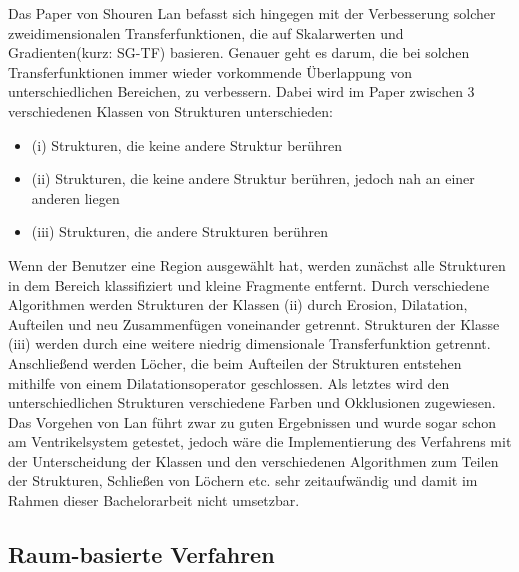 Das Paper von Shouren Lan \cite{lan2017improving} befasst sich hingegen mit der Verbesserung solcher zweidimensionalen Transferfunktionen, die auf Skalarwerten und Gradienten(kurz: SG-TF) basieren.
Genauer geht es darum, die bei solchen Transferfunktionen immer wieder vorkommende Überlappung von unterschiedlichen Bereichen, zu verbessern.
Dabei wird im Paper zwischen 3 verschiedenen Klassen von Strukturen unterschieden:
\begin{itemize}
\item (i) Strukturen, die keine andere Struktur berühren
\item (ii) Strukturen, die keine andere Struktur berühren, jedoch nah an einer anderen liegen
\item (iii) Strukturen, die andere Strukturen berühren
\end{itemize} 
Wenn der Benutzer eine Region ausgewählt hat, werden zunächst alle Strukturen in dem Bereich klassifiziert und kleine Fragmente entfernt. Durch verschiedene Algorithmen werden Strukturen der Klassen (ii) durch Erosion, Dilatation, Aufteilen und neu Zusammenfügen voneinander getrennt. Strukturen der Klasse (iii) werden durch eine weitere niedrig dimensionale Transferfunktion getrennt.
Anschließend werden Löcher, die beim Aufteilen der Strukturen entstehen mithilfe von einem Dilatationsoperator geschlossen. Als letztes wird den unterschiedlichen Strukturen verschiedene Farben und Okklusionen zugewiesen.
\newline
Das Vorgehen von Lan führt zwar zu guten Ergebnissen und wurde sogar schon am Ventrikelsystem getestet, jedoch wäre die Implementierung des Verfahrens mit der Unterscheidung der Klassen und den verschiedenen Algorithmen zum Teilen der Strukturen, Schließen von Löchern etc. sehr zeitaufwändig und damit im Rahmen dieser Bachelorarbeit  nicht umsetzbar.



\subsection{Raum-basierte Verfahren}

